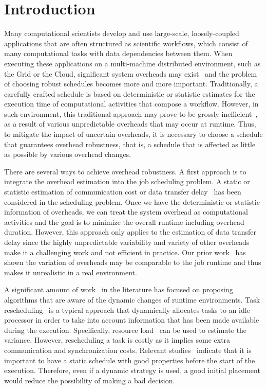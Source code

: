 \documentclass[final]{IEEEtran}
\begin{document}
\section{Introduction}

Many computational scientists develop and use large-scale, loosely-coupled applications that are often structured as scientific workflows, which consist of many computational tasks with data dependencies between them. When executing these applications on a multi-machine distributed environment, such as the Grid or the Cloud, significant system overheads may exist~\cite{Chen, Prodan2008b} and the problem of choosing robust schedules becomes more and more important. Traditionally, a carefully crafted schedule is based on deterministic or statistic estimates for the execution time of computational activities that compose a workflow. However, in such environment, this traditional approach may prove to be grossly inefficient~\cite{WorkflowSim}, as a result of various unpredictable overheads that may occur at runtime. 
Thus, to mitigate the impact of uncertain overheads, it is necessary to choose a schedule that guarantees overhead robustness, that is, a schedule that is affected as little as possible by various overhead changes.  

There are several ways to achieve overhead robustness. A first approach is to integrate the overhead estimation into the job scheduling problem. A static or statistic estimation of communication cost or data transfer delay~\cite{Dong2010, Yang03} has been considered in the scheduling problem. Once we have the deterministic or statistic information of overheads, we can treat the system overhead as computational activities and the goal is to minimize the overall runtime including overhead duration. However, this approach only applies to the estimation of data transfer delay since the highly unpredictable variability and variety of other overheads make it a challenging work and not efficient in practice. Our prior work~\cite{Chen} has shown the variation of overheads may be comparable to the job runtime and thus makes it unrealistic in a real environment.  

A significant amount of work~\cite{Ahmad1998, Chetto1990, Dong2010, Yang03} in the literature has focused on proposing algorithms that are aware of the dynamic changes of runtime environments. Task rescheduling~\cite{Sakellariou2004, Zhang2009, Chen2010} is a typical approach that dynamically allocates tasks to an idle processor in order to take into account information that has been made available during the execution. Specifically, resource load~\cite{Dong2010} can be used to estimate the variance. However, rescheduling a task is costly as it implies some extra communication and synchronization costs. Relevant studies~\cite{Sakellariou2004} indicate that it is important to have a static schedule with good properties before the start of the execution. Therefore, even if a dynamic strategy is used, a good initial placement would reduce the possibility of making a bad decision. 
\end{document}
